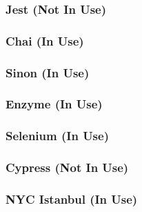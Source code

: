 \documentclass[12pt]{article}
\begin{document}
\subsubsection{Jest (Not In Use)}
\paragraph{}
\subsubsection{Chai (In Use)}
\paragraph{}
\subsubsection{Sinon (In Use)}
\paragraph{}
\subsubsection{Enzyme (In Use)}
\paragraph{}
\subsubsection{Selenium (In Use)}
\paragraph{}
\subsubsection{Cypress (Not In Use)}
\paragraph{}
\subsubsection{NYC Istanbul (In Use)}
\paragraph{}
\newpage
\end{document}
